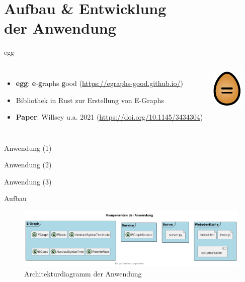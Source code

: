 \EnableTitleSlide
\section{Aufbau \& Entwicklung \\ der Anwendung}

\begin{frame}{egg}
    \begin{columns}[c]
            \begin{itemize}
                \item \textbf{egg}: \textbf{e}-\textbf{g}raphs \textbf{g}ood (\url{https://egraphs-good.github.io/})
                \item Bibliothek in Rust zur Erstellung von E-Graphs
                \item \textbf{Paper}: Willsey u.a. 2021 (\url{https://doi.org/10.1145/3434304})
            \end{itemize}\hspace{2.5cm}
            \includegraphics[scale=1.9]{utils/egg.pdf}
    \end{columns}
\end{frame}

\begin{frame}{Anwendung (1)}
    
\end{frame}

\begin{frame}{Anwendung (2)}
    
\end{frame}

\begin{frame}{Anwendung (3)}
    
\end{frame}

\begin{frame}{Aufbau}
    \begin{figure}[H]
        \centering
        \includegraphics[scale=0.43]{utils/components.png}
        \caption{Architekturdiagramm der Anwendung}
        \label{fig:comps}
    \end{figure}
\end{frame}

